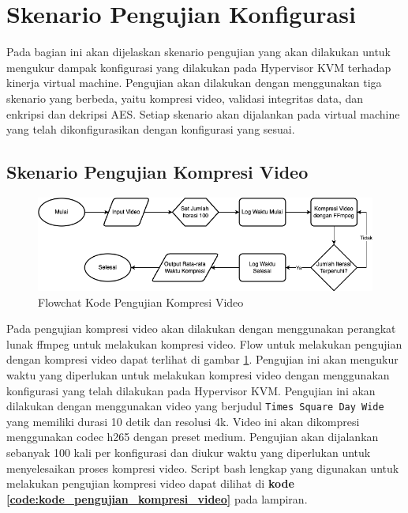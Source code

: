 \section{Skenario Pengujian Konfigurasi}
Pada bagian ini akan dijelaskan skenario pengujian yang akan dilakukan untuk mengukur dampak konfigurasi yang dilakukan pada Hypervisor KVM terhadap kinerja virtual machine. Pengujian akan dilakukan dengan menggunakan tiga skenario yang berbeda, yaitu kompresi video, validasi integritas data, dan enkripsi dan dekripsi AES. Setiap skenario akan dijalankan pada virtual machine yang telah dikonfigurasikan dengan konfigurasi yang sesuai.

\subsection{Skenario Pengujian Kompresi Video}
\begin{figure}
    \centering
    \includegraphics[width=1\textwidth]
    {assets/pics/code-flowchart/flowchart_kompresi_video.png}
    \caption{Flowchat Kode Pengujian Kompresi Video}
    \label{fig:flowchart_kompresi_video}
\end{figure}

Pada pengujian kompresi video akan dilakukan dengan menggunakan perangkat lunak ffmpeg untuk melakukan kompresi video. Flow untuk melakukan pengujian dengan kompresi video dapat terlihat di gambar \ref{fig:flowchart_kompresi_video}. Pengujian ini akan mengukur waktu yang diperlukan untuk melakukan kompresi video dengan menggunakan konfigurasi yang telah dilakukan pada Hypervisor KVM. Pengujian ini akan dilakukan dengan menggunakan video yang berjudul \texttt{Times Square Day Wide} yang memiliki durasi 10 detik dan resolusi 4k. Video ini akan dikompresi menggunakan codec h265 dengan preset medium. Pengujian akan dijalankan sebanyak 100 kali per konfigurasi dan diukur waktu yang diperlukan untuk menyelesaikan proses kompresi video. Script bash lengkap yang digunakan untuk melakukan pengujian kompresi video dapat dilihat di \textbf{kode \ref{code:kode_pengujian_kompresi_video}} pada lampiran.


